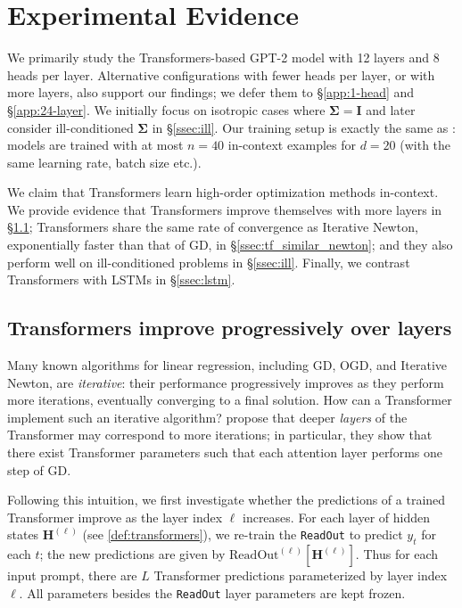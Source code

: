 \documentclass[11pt]{article}
\theoremstyle{plain}
\theoremstyle{definition}
\theoremstyle{remark}
\renewcommand{\^}[1]{^{(#1)}}
\newcommand{\bH}{\boldsymbol{H}}
\newcommand{\bI}{\boldsymbol{I}}
\newcommand{\bSigma}{\boldsymbol{\Sigma}}
\newcommand{\newton}{Iterative Newton}
\begin{document}
\vspace{-1mm}
\section{Experimental Evidence} \label{sec:experiments}
\vspace{-1mm}

We primarily study the Transformers-based GPT-2 model with 12 layers and 8 heads per layer. Alternative configurations with fewer heads per layer, or with more layers, also support our findings; we defer them to \S \ref{app:1-head} and \S\ref{app:24-layer}. We initially focus on isotropic cases where $\bSigma = \bI$ and later consider ill-conditioned $\bSigma$ in \S \ref{ssec:ill}. Our training setup is exactly the same as \citet{Garg2022WhatCT}: models are trained with at most $n = 40$ in-context examples for $d = 20$ (with the same learning rate, batch size etc.).  

We claim that Transformers learn high-order optimization methods in-context. We provide evidence that Transformers improve themselves with more layers in \S \ref{ssec:progress}; Transformers share the same rate of convergence as \newton, exponentially faster than that of GD, in \S \ref{ssec:tf_similar_newton}; and they also  perform well on ill-conditioned problems in \S \ref{ssec:ill}. Finally, we contrast  Transformers with LSTMs in \S \ref{ssec:lstm}.

\vspace{-1mm}
\subsection{Transformers improve progressively over layers} \label{ssec:progress}
\vspace{-1mm}

Many known algorithms for linear regression, including GD, OGD, and \newton, are \emph{iterative}:
their performance progressively improves as they perform more iterations, eventually converging to a final solution.
How can a Transformer implement such an iterative algorithm?
\citet{Oswald2022TransformersLI} propose that deeper \emph{layers} of the Transformer may correspond to more iterations;
in particular, they show that there exist Transformer parameters such that each attention layer performs one step of GD.

Following this intuition, we first investigate whether the predictions of a trained Transformer improve as the layer index $\ell$ increases. 
For each layer of hidden states $\bH^{(\ell)}$ (see \cref{def:transformers}), we re-train the \verb|ReadOut| to predict $y_t$ for each $t$; the new predictions are given by $\mathrm{ReadOut}^{(\ell)}\left[\bH^{(\ell)}\right]$. Thus for each input prompt, there are $L$ Transformer predictions parameterized by layer index $\ell$.
All parameters besides the \verb|ReadOut| layer parameters are kept frozen.
\end{document}
